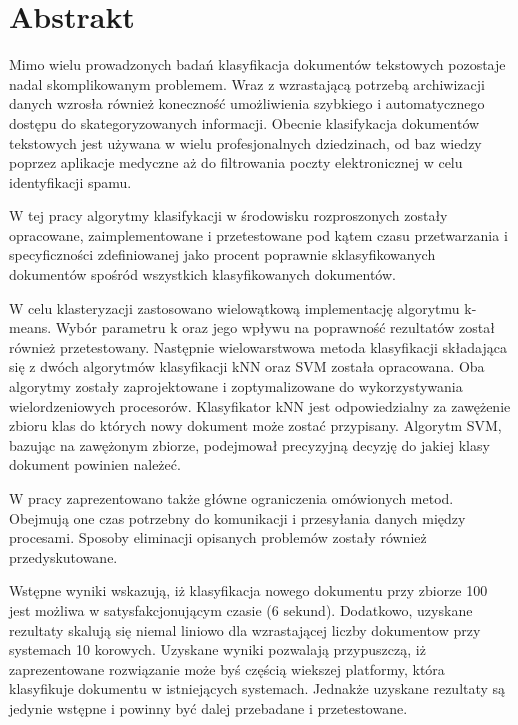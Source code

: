 \chapter*{Abstrakt}

Mimo wielu prowadzonych badań klasyfikacja dokumentów tekstowych pozostaje nadal skomplikowanym problemem. Wraz z wzrastającą potrzebą archiwizacji danych wzrosła również koneczność umożliwienia szybkiego i automatycznego dostępu do skategoryzowanych informacji. Obecnie klasifykacja dokumentów tekstowych jest używana w wielu profesjonalnych dziedzinach, od baz wiedzy poprzez aplikacje medyczne aż do filtrowania poczty elektronicznej w celu identyfikacji spamu.

W tej pracy algorytmy klasifykacji w środowisku rozproszonych zostały opracowane, zaimplementowane i przetestowane pod kątem czasu przetwarzania i specyficzności zdefiniowanej jako procent poprawnie sklasyfikowanych dokumentów spośród wszystkich klasyfikowanych dokumentów.

W celu klasteryzacji zastosowano wielowątkową implementację algorytmu k-means. Wybór parametru k oraz jego wpływu na poprawność rezultatów został również przetestowany. Następnie wielowarstwowa metoda klasyfikacji składająca się z dwóch algorytmów klasyfikacji kNN oraz SVM została opracowana. Oba algorytmy zostały zaprojektowane i zoptymalizowane do wykorzystywania wielordzeniowych procesorów. Klasyfikator kNN jest odpowiedzialny za zawężenie zbioru klas do których nowy dokument może zostać przypisany. Algorytm SVM, bazując na zawężonym zbiorze, podejmował precyzyjną decyzję do jakiej klasy dokument powinien należeć.

W pracy zaprezentowano także główne ograniczenia omówionych metod. Obejmują one czas potrzebny do komunikacji i przesyłania danych między procesami. Sposoby eliminacji opisanych problemów zostały również przedyskutowane.

Wstępne wyniki wskazują, iż klasyfikacja nowego dokumentu przy zbiorze 100 jest możliwa w satysfakcjonującym czasie (6 sekund). Dodatkowo, uzyskane rezultaty skalują się niemal liniowo dla wzrastającej liczby dokumentow przy systemach 10 korowych. Uzyskane wyniki pozwalają przypuszczą, iż zaprezentowane rozwiązanie może byś częścią wiekszej platformy, która klasyfikuje dokumentu w istniejących systemach. Jednakże uzyskane rezultaty są jedynie wstępne i powinny być dalej przebadane i przetestowane.